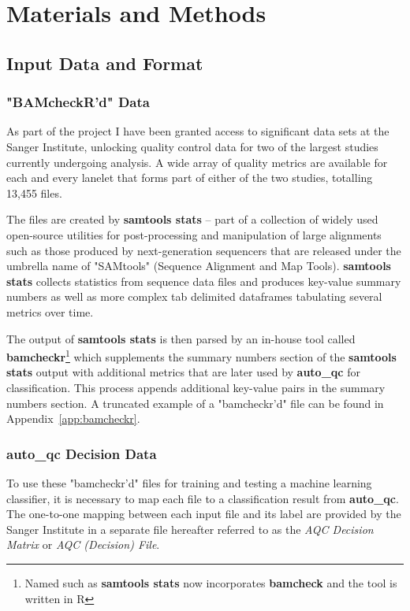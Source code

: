 \chapter{Materials and Methods}
\section{Input Data and Format}
\subsection{"BAMcheckR'd" Data}
\label{chap:bamcheckr-data}

As part of the project I have been granted access to significant data sets at the
Sanger Institute, unlocking quality control data for two of the largest studies
currently undergoing analysis. A wide array of quality metrics are available for
each and every lanelet that forms part of either of the two studies, totalling
13,455 files.


The files are created by \textbf{samtools stats} -- part of a collection of
widely used open-source utilities for post-processing and manipulation of large
alignments such as those produced by next-generation sequencers that are
released under the umbrella name of "SAMtools"\citep{samtools} (Sequence
Alignment and Map Tools). \textbf{samtools stats} collects statistics from
sequence data files and produces key-value summary numbers as well as more
complex tab delimited dataframes tabulating several metrics over time.

The output of \textbf{samtools stats} is then parsed by an in-house tool called
\textbf{bamcheckr}\footnote{Named such as \textbf{samtools stats} now incorporates
\textbf{bamcheck} and the tool is written in R} which supplements the summary
numbers section of the \textbf{samtools stats} output with additional metrics
that are later used by \textbf{auto\_qc} for classification.  This process
appends additional key-value pairs in the summary numbers section.  A truncated
example of a "bamcheckr'd" file can be found in Appendix~\ref{app:bamcheckr}.

\subsection{auto\_qc Decision Data}
To use these "bamcheckr'd" files for training and testing a machine learning
classifier, it is necessary to map each file to a classification result from
\textbf{auto\_qc}. The one-to-one mapping between each input file and its label
are provided by the Sanger Institute in a separate file hereafter referred to as
the \textit{AQC Decision Matrix} or \textit{AQC (Decision) File}.

